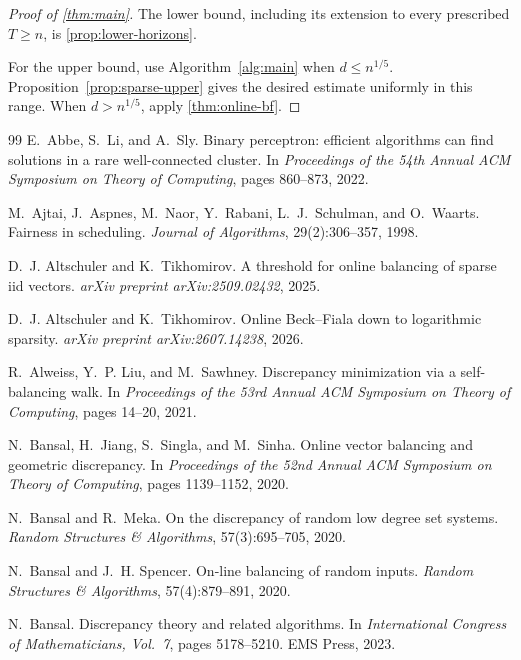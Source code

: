 \documentclass[reqno,english]{amsart}
\theoremstyle{definition}
\begin{document}
\begin{proof}[Proof of \cref{thm:main}]
{
The lower bound, including its extension to every prescribed $T\ge n$,
is \cref{prop:lower-horizons}.
}

For the upper bound, use Algorithm~\ref{alg:main} when $d\le {n^{1/5}}$.
Proposition~\ref{prop:sparse-upper} gives the desired estimate uniformly in this
range.  When $d>{n^{1/5}}$, apply \cref{thm:online-bf}.
\end{proof}

\begin{thebibliography}{99}
E.~Abbe, S.~Li, and A.~Sly.
\newblock Binary perceptron: efficient algorithms can find solutions in a rare
well-connected cluster.
\newblock In \emph{Proceedings of the 54th Annual ACM Symposium on Theory of
Computing}, pages 860--873, 2022.

M.~Ajtai, J.~Aspnes, M.~Naor, Y.~Rabani, L.~J.~Schulman, and O.~Waarts.
\newblock Fairness in scheduling.
\newblock \emph{Journal of Algorithms}, 29(2):306--357, 1998.


D.~J. Altschuler and K.~Tikhomirov.
\newblock A threshold for online balancing of sparse iid vectors.
\newblock \emph{arXiv preprint arXiv:2509.02432}, 2025.


D.~J. Altschuler and K.~Tikhomirov.
\newblock Online Beck--Fiala down to logarithmic sparsity.
\newblock \emph{arXiv preprint arXiv:2607.14238}, 2026.

R.~Alweiss, Y.~P. Liu, and M.~Sawhney.
\newblock Discrepancy minimization via a self-balancing walk.
\newblock In \emph{Proceedings of the 53rd Annual ACM Symposium on Theory of
Computing}, pages 14--20, 2021.

N.~Bansal, H.~Jiang, S.~Singla, and M.~Sinha.
\newblock Online vector balancing and geometric discrepancy.
\newblock In \emph{Proceedings of the 52nd Annual ACM Symposium on Theory of
Computing}, pages 1139--1152, 2020.

N.~Bansal and R.~Meka.
\newblock On the discrepancy of random low degree set systems.
\newblock \emph{Random Structures \& Algorithms}, 57(3):695--705, 2020.

N.~Bansal and J.~H. Spencer.
\newblock On-line balancing of random inputs.
\newblock \emph{Random Structures \& Algorithms}, 57(4):879--891, 2020.

N.~Bansal.
\newblock Discrepancy theory and related algorithms.
\newblock In \emph{International Congress of Mathematicians, Vol.~7},
pages 5178--5210. EMS Press, 2023.


\end{thebibliography}
\end{document}
